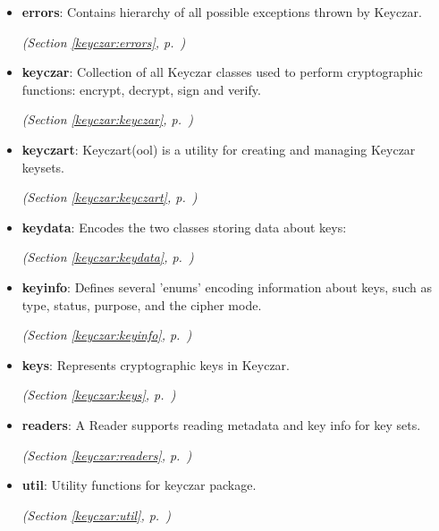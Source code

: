\begin{itemize}
\setlength{\parskip}{0ex}
\item \textbf{errors}: Contains hierarchy of all possible exceptions thrown by Keyczar.



  \textit{(Section \ref{keyczar:errors}, p.~\pageref{keyczar:errors})}

\item \textbf{keyczar}: Collection of all Keyczar classes used to perform cryptographic functions: 
encrypt, decrypt, sign and verify.



  \textit{(Section \ref{keyczar:keyczar}, p.~\pageref{keyczar:keyczar})}

\item \textbf{keyczart}: Keyczart(ool) is a utility for creating and managing Keyczar keysets.



  \textit{(Section \ref{keyczar:keyczart}, p.~\pageref{keyczar:keyczart})}

\item \textbf{keydata}: Encodes the two classes storing data about keys:



  \textit{(Section \ref{keyczar:keydata}, p.~\pageref{keyczar:keydata})}

\item \textbf{keyinfo}: Defines several 'enums' encoding information about keys, such as type, 
status, purpose, and the cipher mode.



  \textit{(Section \ref{keyczar:keyinfo}, p.~\pageref{keyczar:keyinfo})}

\item \textbf{keys}: Represents cryptographic keys in Keyczar.



  \textit{(Section \ref{keyczar:keys}, p.~\pageref{keyczar:keys})}

\item \textbf{readers}: A Reader supports reading metadata and key info for key sets.



  \textit{(Section \ref{keyczar:readers}, p.~\pageref{keyczar:readers})}

\item \textbf{util}: Utility functions for keyczar package.



  \textit{(Section \ref{keyczar:util}, p.~\pageref{keyczar:util})}

\end{itemize}

